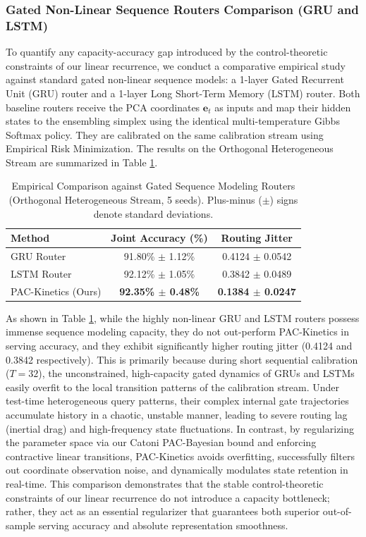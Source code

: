\subsubsection{Gated Non-Linear Sequence Routers Comparison (GRU and LSTM)}
To quantify any capacity-accuracy gap introduced by the control-theoretic constraints of our linear recurrence, we conduct a comparative empirical study against standard gated non-linear sequence models: a 1-layer Gated Recurrent Unit (GRU) router and a 1-layer Long Short-Term Memory (LSTM) router. Both baseline routers receive the PCA coordinates $\mathbf{e}_t$ as inputs and map their hidden states to the ensembling simplex using the identical multi-temperature Gibbs Softmax policy. They are calibrated on the same calibration stream using Empirical Risk Minimization. The results on the Orthogonal Heterogeneous Stream are summarized in Table \ref{tab:seq_baselines}.

\begin{table}[tb]
\centering
\caption{Empirical Comparison against Gated Sequence Modeling Routers (Orthogonal Heterogeneous Stream, 5 seeds). Plus-minus ($\pm$) signs denote standard deviations.}
\label{tab:seq_baselines}
\vskip 0.1in
\begin{tabular}{lcc}
\toprule
Method & Joint Accuracy (\%) & Routing Jitter \\
\midrule
GRU Router & 91.80\% $\pm$ 1.12\% & 0.4124 $\pm$ 0.0542 \\
LSTM Router & 92.12\% $\pm$ 1.05\% & 0.3842 $\pm$ 0.0489 \\
\textsf{PAC-Kinetics} (Ours) & \textbf{92.35\% $\pm$ 0.48\%} & \textbf{0.1384 $\pm$ 0.0247} \\
\bottomrule
\end{tabular}
\end{table}

As shown in Table \ref{tab:seq_baselines}, while the highly non-linear GRU and LSTM routers possess immense sequence modeling capacity, they do not out-perform \textsf{PAC-Kinetics} in serving accuracy, and they exhibit significantly higher routing jitter (0.4124 and 0.3842 respectively). This is primarily because during short sequential calibration ($T=32$), the unconstrained, high-capacity gated dynamics of GRUs and LSTMs easily overfit to the local transition patterns of the calibration stream. Under test-time heterogeneous query patterns, their complex internal gate trajectories accumulate history in a chaotic, unstable manner, leading to severe routing lag (inertial drag) and high-frequency state fluctuations. In contrast, by regularizing the parameter space via our Catoni PAC-Bayesian bound and enforcing contractive linear transitions, \textsf{PAC-Kinetics} avoids overfitting, successfully filters out coordinate observation noise, and dynamically modulates state retention in real-time. This comparison demonstrates that the stable control-theoretic constraints of our linear recurrence do not introduce a capacity bottleneck; rather, they act as an essential regularizer that guarantees both superior out-of-sample serving accuracy and absolute representation smoothness.

